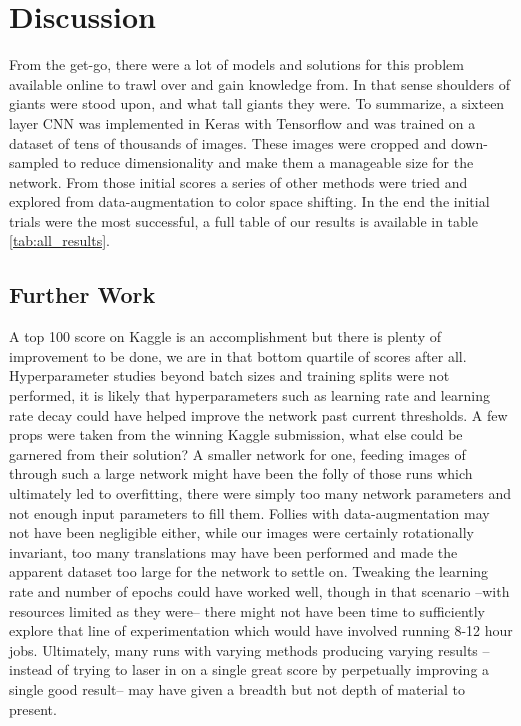 \section{Discussion}

From the get-go, there were a lot of models and solutions for this problem available online to trawl over and gain knowledge from. In that sense shoulders of giants were stood upon, and what tall giants they were. To summarize, a sixteen layer CNN was implemented in Keras with Tensorflow and was trained on a dataset of tens of thousands of images. These images were cropped and down-sampled to reduce dimensionality and make them a manageable size for the network. From those initial scores a series of other methods were tried and explored from data-augmentation to color space shifting. In the end the initial trials were the most successful, a full table of our results is available in table \ref{tab:all_results}.

\subsection{Further Work}
A top 100 score on Kaggle is an accomplishment but there is plenty of improvement to be done, we are in that bottom quartile of scores after all. Hyperparameter studies beyond batch sizes and training splits were not performed, it is likely that hyperparameters such as learning rate and learning rate decay could have helped improve the network past current thresholds. A few props were taken from the winning Kaggle submission, what else could be garnered from their solution? A smaller network for one, feeding images of  through such a large network might have been the folly of those runs which ultimately led to overfitting, there were simply too many network parameters and not enough input parameters to fill them. Follies with data-augmentation may not have been negligible either, while our images were certainly rotationally invariant, too many translations may have been performed and made the apparent dataset too large for the network to settle on. Tweaking the learning rate and number of epochs could have worked well, though in that scenario --with resources limited as they were-- there might not have been time to sufficiently explore that line of experimentation which would have involved running 8-12 hour jobs. Ultimately, many runs with varying methods producing varying results --instead of trying to laser in on a single great score by perpetually improving a single good result-- may have given a breadth but not depth of material to present. 

